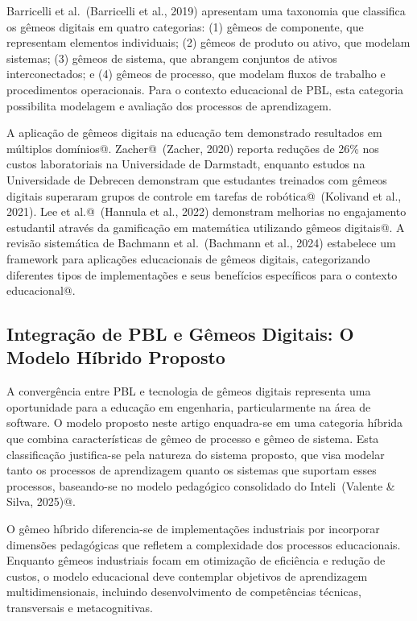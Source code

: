 \documentclass[english, spanish, brazilian]{modelo_dt}
\begin{document}
Barricelli et al.\@~(Barricelli et al., 2019) apresentam uma taxonomia que classifica os gêmeos digitais em quatro categorias: (1) gêmeos de componente, que representam elementos individuais; (2) gêmeos de produto ou ativo, que modelam sistemas; (3) gêmeos de sistema, que abrangem conjuntos de ativos interconectados; e (4) gêmeos de processo, que modelam fluxos de trabalho e procedimentos operacionais\@. Para o contexto educacional de PBL, esta categoria possibilita modelagem e avaliação dos processos de aprendizagem\@.

A aplicação de gêmeos digitais na educação tem demonstrado resultados em múltiplos domínios@. Zacher@~(Zacher, 2020) reporta reduções de 26\% nos custos laboratoriais na Universidade de Darmstadt, enquanto estudos na Universidade de Debrecen demonstram que estudantes treinados com gêmeos digitais superaram grupos de controle em tarefas de robótica@~(Kolivand et al., 2021). Lee et al.@~(Hannula et al., 2022) demonstram melhorias no engajamento estudantil através da gamificação em matemática utilizando gêmeos digitais@. A revisão sistemática de Bachmann et al.~(Bachmann et al., 2024) estabelece um framework para aplicações educacionais de gêmeos digitais, categorizando diferentes tipos de implementações e seus benefícios específicos para o contexto educacional@.

\subsection{Integração de PBL e Gêmeos Digitais: O Modelo Híbrido Proposto}

A convergência entre PBL e tecnologia de gêmeos digitais representa uma oportunidade para a educação em engenharia, particularmente na área de software\@. O modelo proposto neste artigo enquadra-se em uma categoria híbrida que combina características de gêmeo de processo e gêmeo de sistema\@. Esta classificação justifica-se pela natureza do sistema proposto, que visa modelar tanto os processos de aprendizagem quanto os sistemas que suportam esses processos, baseando-se no modelo pedagógico consolidado do Inteli~(Valente & Silva, 2025)@.

O gêmeo híbrido diferencia-se de implementações industriais por incorporar dimensões pedagógicas que refletem a complexidade dos processos educacionais\@. Enquanto gêmeos industriais focam em otimização de eficiência e redução de custos, o modelo educacional deve contemplar objetivos de aprendizagem multidimensionais, incluindo desenvolvimento de competências técnicas, transversais e metacognitivas\@.
\end{document}
